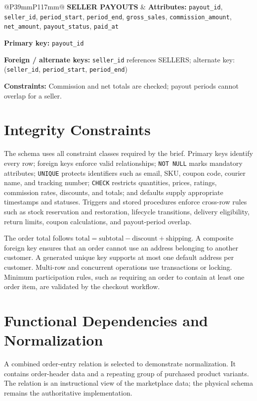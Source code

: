 \documentclass[11pt,a4paper,oneside]{report}
\begin{document}
\begin{longtable}{@{}P{39mm}P{117mm}@{}}
\textbf{SELLER PAYOUTS} & \textbf{Attributes:} \texttt{payout\_id}, \texttt{seller\_id}, \texttt{period\_start}, \texttt{period\_end}, \texttt{gross\_sales}, \texttt{commission\_amount}, \texttt{net\_amount}, \texttt{payout\_status}, \texttt{paid\_at}\par\textbf{Primary key:} \texttt{payout\_id}\par\textbf{Foreign / alternate keys:} \texttt{seller\_id} references SELLERS; alternate key: (\texttt{seller\_id}, \texttt{period\_start}, \texttt{period\_end})\par\textbf{Constraints:} Commission and net totals are checked; payout periods cannot overlap for a seller. \\
\end{longtable}
\normalsize

\section{Integrity Constraints}
The schema uses all constraint classes required by the brief. Primary keys identify every row; foreign keys enforce valid relationships; \texttt{NOT NULL} marks mandatory attributes; \texttt{UNIQUE} protects identifiers such as email, SKU, coupon code, courier name, and tracking number; \texttt{CHECK} restricts quantities, prices, ratings, commission rates, discounts, and totals; and defaults supply appropriate timestamps and statuses. Triggers and stored procedures enforce cross-row rules such as stock reservation and restoration, lifecycle transitions, delivery eligibility, return limits, coupon calculations, and payout-period overlap.

The order total follows $\text{total} = \text{subtotal} - \text{discount} + \text{shipping}$. A composite foreign key ensures that an order cannot use an address belonging to another customer. A generated unique key supports at most one default address per customer. Multi-row and concurrent operations use transactions or locking. Minimum participation rules, such as requiring an order to contain at least one order item, are validated by the checkout workflow.

\section{Functional Dependencies and Normalization}
A combined order-entry relation is selected to demonstrate normalization. It contains order-header data and a repeating group of purchased product variants. The relation is an instructional view of the marketplace data; the physical schema remains the authoritative implementation.
\end{document}
